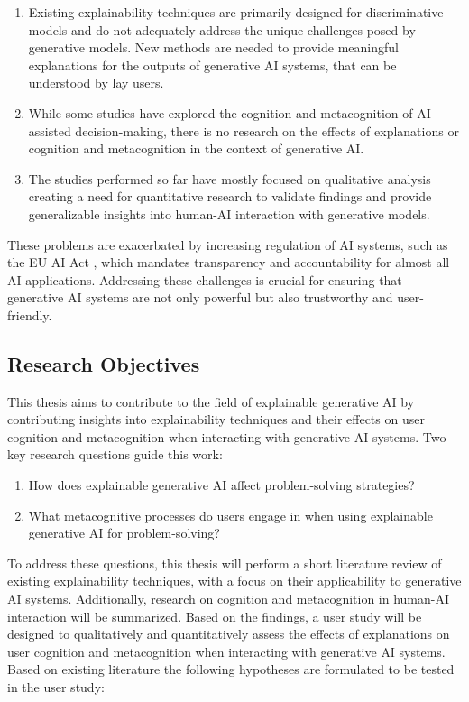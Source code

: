\begin{enumerate}
    \item Existing explainability techniques are primarily designed for discriminative models and do not adequately address the unique challenges posed by generative models. New methods are needed to provide meaningful explanations for the outputs of generative \ac{AI} systems, that can be understood by lay users.
    \item While some studies have explored the cognition and metacognition of \ac{AI}-assisted decision-making, there is no research on the effects of explanations or cognition and metacognition in the context of generative \ac{AI}.
    \item The studies performed so far have mostly focused on qualitative analysis creating a need for quantitative research to validate findings and provide generalizable insights into human-\ac{AI} interaction with generative models.
\end{enumerate}

These problems are exacerbated by increasing regulation of \ac{AI} systems, such as the \ac{EU} \ac{AI} Act \parencite{EuropeanUnion2024}, which mandates transparency and accountability for almost all \ac{AI} applications. Addressing these challenges is crucial for ensuring that generative \ac{AI} systems are not only powerful but also trustworthy and user-friendly.

\subsection{Research Objectives} \label{subsec:research-objectives}

This thesis aims to contribute to the field of explainable generative \ac{AI} by contributing insights into explainability techniques and their effects on user cognition and metacognition when interacting with generative \ac{AI} systems. Two key research questions guide this work:

\begin{enumerate}
    \item How does explainable generative \ac{AI} affect problem-solving strategies?
    \item What metacognitive processes do users engage in when using explainable generative \ac{AI} for problem-solving?
\end{enumerate}

To address these questions, this thesis will perform a short literature review of existing explainability techniques, with a focus on their applicability to generative \ac{AI} systems. Additionally, research on cognition and metacognition in human-\ac{AI} interaction will be summarized. Based on the findings, a user study will be designed to qualitatively and quantitatively assess the effects of explanations on user cognition and metacognition when interacting with generative \ac{AI} systems. Based on existing literature the following hypotheses are formulated to be tested in the user study:

